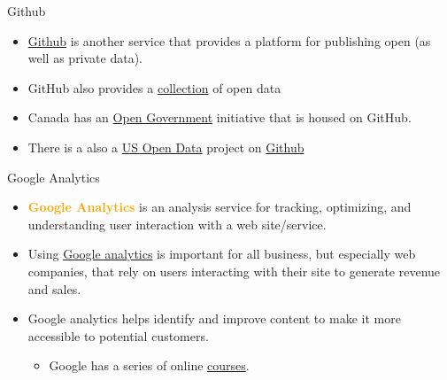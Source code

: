 \documentclass[xcolor=svgnames]{beamer}
\newcommand{\nl}{\\[1em]}
\newcommand{\define}[1]{\textbf{\textcolor{orange}{#1}}}
\begin{document}
\begin{frame}{Github}
\begin{itemize}
\item \href{https://github.com/}{Github} is another service that provides a platform for publishing open (as well as private data).\nl
\item GitHub also provides a %
\href{https://github.com/collections/open-data}{collection} of open data\nl
\item {Canada} has an \href{https://github.com/open-data}{Open Government} initiative that is housed on GitHub.\nl
\item There is a also a \href{https://usopendata.org/}{US Open Data} project on \href{https://github.com/opendata}{Github}
\end{itemize}

\end{frame}


\begin{frame}{Google Analytics}
\begin{itemize}
\item \define{Google Analytics} is an analysis service for tracking, optimizing, and understanding user interaction with a web site/service.\nl

\item Using \href{https://analytics.google.com/analytics/web/provision/?authuser=0\#/provision}{Google analytics} is important for all business, but especially web companies, that rely on users interacting with their site to generate revenue and sales.\nl

\item Google analytics helps identify and improve content to make it more accessible to potential customers.
\begin{itemize}
\item Google has a series of online \href{https://analytics.google.com/analytics/academy/}{courses}.
\end{itemize}


\end{itemize}
\end{frame}
\end{document}
